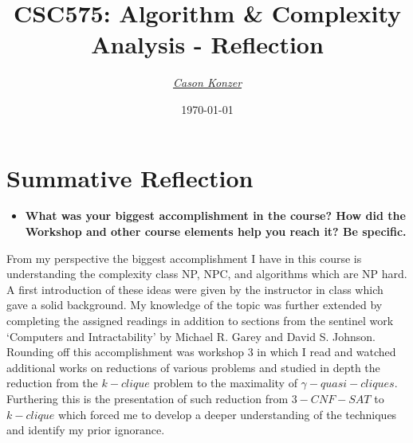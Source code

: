 \documentclass[12pt]{article}
\newcommand{\XB}{\color{black}}
\newcommand{\XV}{\color{violet}}
\begin{document}
\title{\textbf{CSC575}: Algorithm \& Complexity Analysis - Reflection}
\date{\today}
\author{\XV\textit{\large{\href{https://github.com/casonk}{Cason Konzer}}}\XB}

\maketitle
\hrulefill
\vfill

\newpage

\section{Summative Reflection}
\begin{itemize}
    \item \textbf{What was your biggest accomplishment in the course? How did the Workshop and other course elements help you reach it? Be specific.}
\end{itemize}

From my perspective the biggest accomplishment I have in this course is understanding the complexity class NP, NPC, and algorithms which are NP hard. A first introduction of these ideas were given by the instructor in class which gave a solid background. My knowledge of the topic was further extended by completing the assigned readings in addition to sections from the sentinel work `Computers and Intractability' by Michael R. Garey and David S. Johnson. Rounding off this accomplishment was workshop 3 in which I read and watched additional works on reductions of various problems and studied in depth the reduction from the \(k-clique\) problem to the maximality of \(\gamma-quasi-cliques\). Furthering this is the presentation of such reduction from $3-CNF-SAT$ to $k-clique$ which forced me to develop a deeper understanding of the techniques and identify my prior ignorance.
\end{document}
